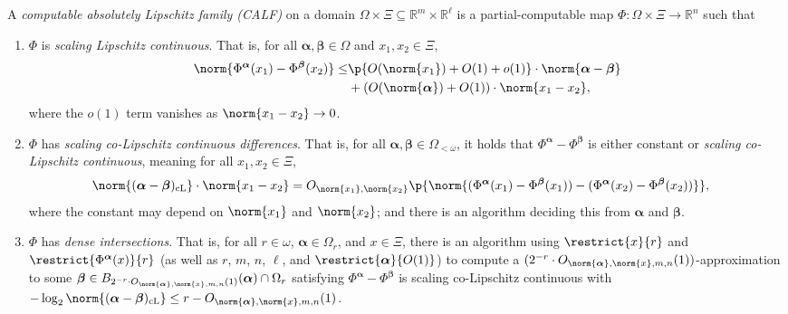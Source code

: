 \begin{definition}
    A \textit{computable absolutely Lipschitz family (CALF)} on a domain $\Omega \times \Xi \subseteq \mathbb{R}^m \times \mathbb{R}^\ell$ is a partial-computable map $\Phi : \Omega \times \Xi \to \mathbb{R}^n$ such that 
    \begin{enumerate}[label = (\roman*)]
        \item $\Phi$ is \textit{scaling Lipschitz continuous}. That is, for all $\boldsymbol{\alpha}, \boldsymbol{\beta} \in \Omega$ and $x_1, x_2 \in \Xi$,
        \begin{align*}
            \norm{\Phi^{\boldsymbol{\alpha}}(x_1) - \Phi^{\boldsymbol{\beta}}(x_2)} \leq &\p{O(\norm{x_1}) + O(1) + o(1)} \cdot \norm{\boldsymbol{\alpha} - \boldsymbol{\beta}}\\
            &+ (O(\norm{\boldsymbol{\alpha}}) + O(1)) \cdot \norm{x_1 - x_2},
        \end{align*}
        where the $o(1)$ term vanishes as $\norm{x_1 - x_2} \to 0$.
        \item $\Phi$ has \textit{scaling co-Lipschitz continuous differences}. That is, for all $\boldsymbol{\alpha}, \boldsymbol{\beta} \in \Omega_{< \omega}$, it holds that $\Phi^{\boldsymbol{\alpha}} - \Phi^{\boldsymbol{\beta}}$ is either constant or \textit{scaling co-Lipschitz continuous}, meaning for all $x_1, x_2 \in \Xi$,
        \begin{align*}
            \norm{(\boldsymbol{\alpha} - \boldsymbol{\beta})_{\operatorname{cL}}} \cdot \norm{x_1 - x_2} &= O_{\norm{x_1}, \norm{x_2}}\p{\norm{(\Phi^{\boldsymbol{\alpha}}(x_1) - \Phi^{\boldsymbol{\beta}}(x_1)) - (\Phi^{\boldsymbol{\alpha}}(x_2) - \Phi^{\boldsymbol{\beta}}(x_2))}},
        \end{align*}
        where the constant may depend on $\norm{x_1}$ and $\norm{x_2}$;
        and there is an algorithm deciding this from $\boldsymbol{\alpha}$ and $\boldsymbol{\beta}$.  
        \item $\Phi$ has \textit{dense intersections}. That is, for all $r \in \omega$, $\boldsymbol{\alpha} \in \Omega_{r}$, and $x \in \Xi$, there is an algorithm using $\restrict{x}{r}$ and $\restrict{\Phi^{\boldsymbol{\alpha}}(x)}{r}$ (as well as $r$, $m$, $n$, $\ell$, and $\restrict{\boldsymbol{\alpha}}{O(1)}$) to compute a $(2^{-r} \cdot  O_{\norm{\boldsymbol{\alpha}}, \norm{x}, m, n}(1))$-approximation to some $\boldsymbol{\beta} \in B_{2^{-r} \cdot O_{\norm{\boldsymbol{\alpha}}, \norm{x}, m, n}(1)}(\boldsymbol{\alpha}) \cap \Omega_r$ satisfying $\Phi^{\boldsymbol{\alpha}} - \Phi^{\boldsymbol{\beta}}$ is scaling co-Lipschitz continuous with $-\log_2 \norm{(\boldsymbol{\alpha} - \boldsymbol{\beta})_{\operatorname{cL}}} \leq r - O_{\norm{\boldsymbol{\alpha}}, \norm{x}, m, n}(1)$.
    \end{enumerate}
\end{definition}

